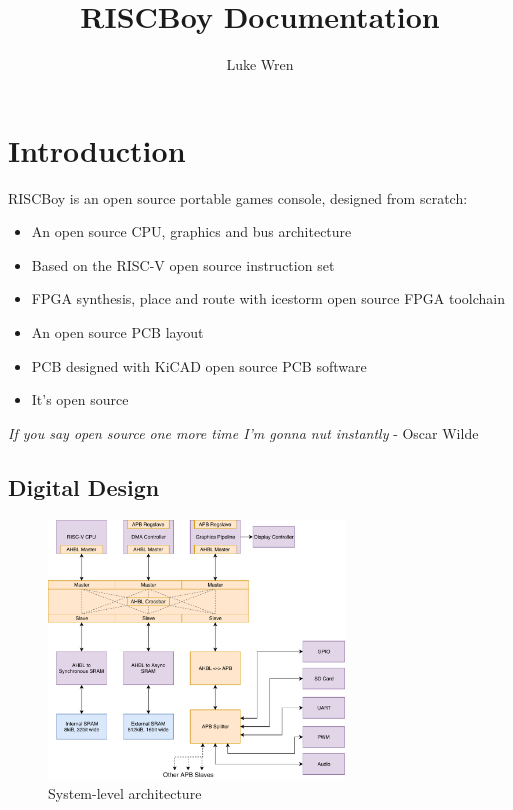 \documentclass[notitlepage]{article}
\title{RISCBoy Documentation}
\author{Luke Wren}
\makeatletter
\newcommand*{\toccontents}{\@starttoc{toc}}
\makeatother
\begin{document}
\maketitle
\toccontents
\newpage
{}

\section{Introduction}

RISCBoy is an open source portable games console, designed from scratch:

\begin{itemize}
\item An open source CPU, graphics and bus architecture
\item Based on the RISC-V open source instruction set
\item FPGA synthesis, place and route with icestorm open source FPGA toolchain
\item An open source PCB layout
\item PCB designed with KiCAD open source PCB software
\item It's open source
\end{itemize}

\begin{displayquote}
\textit{If you say open source one more time I'm gonna nut instantly} - Oscar Wilde
\end{displayquote}

\subsection{Digital Design}

\begin{figure}[!htb]
\caption{System-level architecture}
\label{diagram:system_arch}
\centering
\includegraphics[width=0.7\textwidth]{diagrams/system_arch.pdf}
\end{figure}
\end{document}
